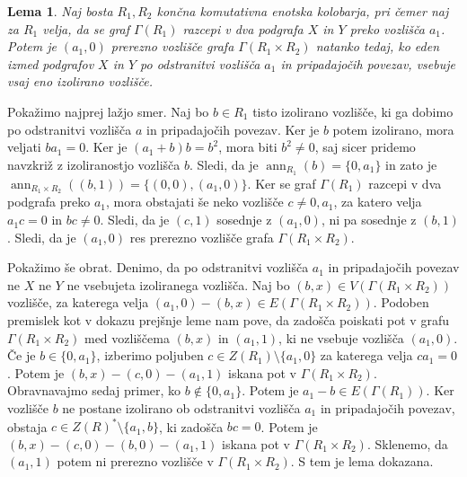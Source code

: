 \documentclass[a4paper, 12pt]{amsart}
\theoremstyle{definition} %
\theoremstyle{plain} %
\newtheorem{lema}[definicija]{Lema}
\DeclareMathOperator{\ann}{ann}
\begin{document}
\begin{lema}
\label{cutVertexProduct}
Naj bosta $R_1, R_2$ končna komutativna enotska kolobarja, pri čemer naj za $R_1$ velja, da se graf $\Gamma(R_1)$ razcepi v dva podgrafa $X$ in $Y$ preko vozlišča $a_1$. Potem je $(a_1,0) $ prerezno vozlišče grafa $\Gamma(R_1 \times R_2)$ natanko tedaj, ko eden izmed podgrafov $X$ in $Y$ po odstranitvi vozlišča $a_1$ in pripadajočih povezav, vsebuje vsaj eno izolirano vozlišče.
\end{lema}

\proof
Pokažimo najprej lažjo smer. Naj bo $b\in R_1$ tisto izolirano vozlišče, ki ga dobimo po odstranitvi vozlišča $a$ in pripadajočih povezav. Ker je $b$ potem izolirano, mora veljati $ba_1 = 0$. Ker je $(a_1 + b)b = b^2$, mora biti $b^2\neq 0$, saj sicer pridemo navzkriž z izoliranostjo vozlišča $b$. Sledi, da je $\ann_{R_1}(b) = \{0,a_1\}$ in zato je $\ann_{R_1\times R_2}((b,1)) = \{(0,0),(a_1,0)\}$. Ker se graf $\Gamma(R_1)$ razcepi v dva podgrafa preko $a_1$, mora obstajati še neko vozlišče $c\neq 0,a_1$, za katero velja $a_1 c = 0$ in $bc\neq 0$. Sledi, da je $(c,1)$ sosednje z $(a_1,0)$, ni pa sosednje z $(b,1)$. Sledi, da je $(a_1,0)$ res prerezno vozlišče grafa $\Gamma(R_1 \times R_2)$.

Pokažimo še obrat. Denimo, da po odstranitvi vozlišča $a_1$ in pripadajočih povezav ne $X$ ne $Y$ ne vsebujeta izoliranega vozlišča. Naj bo $(b,x)\in V(\Gamma(R_1\times R_2))$ vozlišče, za katerega velja $(a_1,0) -(b,x) \in E(\Gamma(R_1\times R_2))$. Podoben premislek kot v dokazu prejšnje leme nam pove, da zadošča poiskati pot  v grafu $\Gamma(R_1 \times R_2)$ med vozliščema $(b,x)$ in $(a_1,1)$, ki ne vsebuje vozlišča $(a_1,0)$. Če je $b\in \{0,a_1\}$, izberimo poljuben $c\in Z(R_1) \setminus \{a_1,0\}$ za katerega velja $ca_1 = 0$. Potem je $(b,x) - (c,0) - (a_1,1)$ iskana pot v $\Gamma(R_1 \times R_2)$. Obravnavajmo sedaj primer, ko $b\notin \{0,a_1\}$. Potem je $a_1 -b\in E(\Gamma(R_1))$. Ker vozlišče $b$ ne postane izolirano ob odstranitvi vozlišča $a_1$ in pripadajočih povezav, obstaja $c\in Z(R)^*\setminus\{a_1,b\}$, ki zadošča $bc=0$. Potem je $(b,x)-(c,0)-(b,0)-(a_1,1)$ iskana pot v $\Gamma(R_1\times R_2)$. Sklenemo, da $(a_1,1)$ potem ni prerezno vozlišče v $\Gamma(R_1 \times R_2)$. S tem je lema dokazana. 
\endproof
\end{document}
